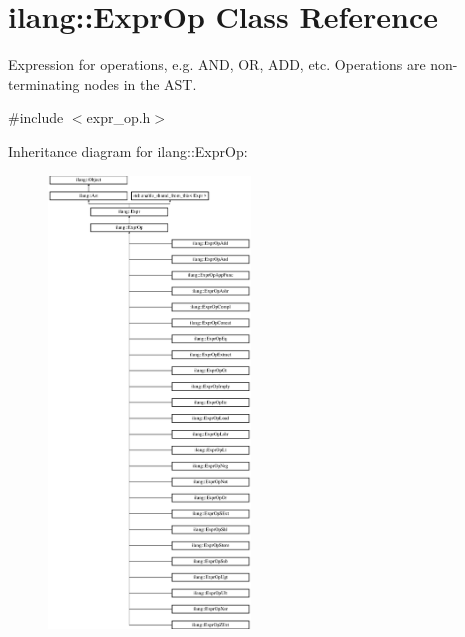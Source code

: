 \hypertarget{classilang_1_1_expr_op}{}\section{ilang\+:\+:Expr\+Op Class Reference}
\label{classilang_1_1_expr_op}


Expression for operations, e.\+g. A\+ND, OR, A\+DD, etc. Operations are non-\/terminating nodes in the A\+ST.  




{\ttfamily \#include $<$expr\+\_\+op.\+h$>$}

Inheritance diagram for ilang\+:\+:Expr\+Op\+:\begin{figure}[H]
\begin{center}
\leavevmode
\includegraphics[height=12.000000cm]{classilang_1_1_expr_op}
\end{center}
\end{figure}
